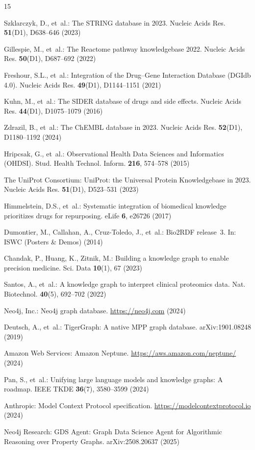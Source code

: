 \documentclass[runningheads]{llncs}
\begin{document}

\begin{thebibliography}{15}

Szklarczyk, D., et~al.:
The {STRING} database in 2023.
Nucleic Acids Res. \textbf{51}(D1), D638--646 (2023)

Gillespie, M., et~al.:
The {Reactome} pathway knowledgebase 2022.
Nucleic Acids Res. \textbf{50}(D1), D687--692 (2022)

Freshour, S.L., et~al.:
Integration of the {Drug--Gene Interaction Database (DGIdb 4.0)}.
Nucleic Acids Res. \textbf{49}(D1), D1144--1151 (2021)

Kuhn, M., et~al.:
The {SIDER} database of drugs and side effects.
Nucleic Acids Res. \textbf{44}(D1), D1075--1079 (2016)

Zdrazil, B., et~al.:
The {ChEMBL} database in 2023.
Nucleic Acids Res. \textbf{52}(D1), D1180--1192 (2024)

Hripcsak, G., et~al.:
Observational Health Data Sciences and Informatics (OHDSI).
Stud. Health Technol. Inform. \textbf{216}, 574--578 (2015)

The UniProt Consortium:
{UniProt}: the Universal Protein Knowledgebase in 2023.
Nucleic Acids Res. \textbf{51}(D1), D523--531 (2023)

Himmelstein, D.S., et~al.:
Systematic integration of biomedical knowledge prioritizes drugs for
repurposing.
eLife \textbf{6}, e26726 (2017)

Dumontier, M., Callahan, A., Cruz-Toledo, J., et~al.:
Bio2{RDF} release~3.
In: ISWC (Posters \& Demos) (2014)

Chandak, P., Huang, K., Zitnik, M.:
Building a knowledge graph to enable precision medicine.
Sci. Data \textbf{10}(1), 67 (2023)

Santos, A., et~al.:
A knowledge graph to interpret clinical proteomics data.
Nat. Biotechnol. \textbf{40}(5), 692--702 (2022)

Neo4j, Inc.: Neo4j graph database. \url{https://neo4j.com} (2024)

Deutsch, A., et~al.:
{TigerGraph}: A native {MPP} graph database.
arXiv:1901.08248 (2019)

Amazon Web Services: Amazon {Neptune}.
\url{https://aws.amazon.com/neptune/} (2024)

Pan, S., et~al.:
Unifying large language models and knowledge graphs: A roadmap.
IEEE TKDE \textbf{36}(7), 3580--3599 (2024)

Anthropic: Model {Context Protocol} specification.
\url{https://modelcontextprotocol.io} (2024)

Neo4j Research:
{GDS Agent}: Graph Data Science Agent for Algorithmic Reasoning over
Property Graphs.
arXiv:2508.20637 (2025)

\end{thebibliography}
\end{document}

